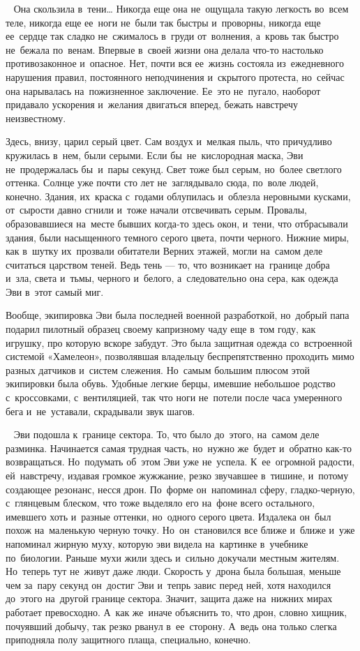 
~
Она скользила в~тени… Никогда еще она не~ощущала такую легкость во~всем теле, никогда еще ее~ноги не~были так быстры и~проворны, никогда еще ее~сердце так сладко не~сжималось в~груди от~волнения, а~кровь так быстро не~бежала по~венам.
Впервые в~своей жизни она делала что-то настолько противозаконное и~опасное.
Нет, почти вся ее~жизнь состояла из~ежедневного нарушения правил, постоянного неподчинения и~скрытого протеста, но~сейчас она нарывалась на~пожизненное заключение.
Ее~это не~пугало, наоборот придавало ускорения и~желания двигаться вперед, бежать навстречу неизвестному.
 
Здесь, внизу, царил серый цвет.
Сам воздух и~мелкая пыль, что причудливо кружилась в~нем, были серыми.
Если бы~не~кислородная маска, Эви не~продержалась бы~и~пары секунд.
Свет тоже был серым, но~более светлого оттенка.
Солнце уже почти сто лет не~заглядывало сюда, по~воле людей, конечно.
Здания, их~краска с~годами облупилась и~облезла неровными кусками, от~сырости давно сгнили и~тоже начали отсвечивать серым.
Провалы, образовавшиеся на~месте бывших когда-то здесь окон, и~тени, что отбрасывали здания, были насыщенного темного серого цвета, почти черного.
Нижние миры, как в~шутку их~прозвали обитатели Верних этажей, могли на~самом деле считаться царством теней.
Ведь тень --- то, что возникает на~границе добра и~зла, света и~тьмы, черного и~белого, а~следовательно она сера, как одежда Эви в~этот самый миг.
 
Вообще, экипировка Эви была последней военной разработкой, но~добрый папа подарил пилотный образец своему капризному чаду еще в~том году, как игрушку, про которую вскоре забудут.
Это была защитная одежда со~встроенной системой «Хамелеон», позволявшая владельцу беспрепятственно проходить мимо разных датчиков и~систем слежения.
Но~самым большим плюсом этой экипировки была обувь.
Удобные легкие берцы, имевшие небольшое родство с~кроссовками, с~вентиляцией, так что ноги не~потели после часа умеренного бега и~не~уставали, скрадывали звук шагов.

~
Эви подошла к~границе сектора.
То, что было до~этого, на~самом деле разминка.
Начинается самая трудная часть, но~нужно же~будет и~обратно как-то возвращаться.
Но~подумать об~этом Эви уже не~успела.
К~ее~огромной радости, ей~навстречу, издавая громкое жужжание, резко звучавшее в~тишине, и~потому создающее резонанс, несся дрон.
По~форме он~напоминал сферу, гладко-черную, с~глянцевым блеском, что тоже выделяло его на~фоне всего остального, имевшего хоть и~разные оттенки, но~одного серого цвета.
Издалека он~был похож на~маленькую черную точку.
Но~он~становился все ближе и~ближе и~уже напоминал жирную муху, которую эви видела на~картинке в~учебнике по~биологии.
Раньше мухи жили здесь и~сильно докучали местным жителям.
Но~теперь тут не~живут даже люди.
Скорость у~дрона была большая, меньше чем за~пару секунд он~достиг Эви и~тепрь завис перед ней, хотя находился до~этого на~другой границе сектора.
Значит, защита даже на~нижних мирах работает превосходно.
А~как же~иначе объяснить то, что дрон, словно хищник, почуявший добычу, так резко рванул в~ее~сторону.
А~ведь она только слегка приподняла полу защитного плаща, специально, конечно.
 
